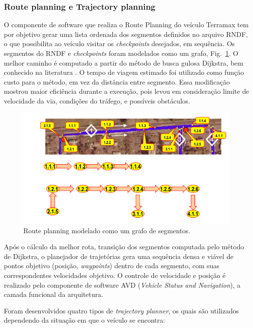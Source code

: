 \subsubsection{Route planning e Trajectory planning}

O componente de software que realiza o Route Planning do veículo Terramax tem
por objetivo gerar uma lista ordenada dos segmentos definidos no arquivo RNDF, o
que possibilita ao veículo visitar os \textit{checkpoints} desejados, em
sequência. Os segmentos do RNDF e \textit{checkpoints} foram modelados como um
grafo, Fig.~\ref{fig:route}. O melhor caminho é computado a partir do método de
busca gulosa Dijkstra, bem conhecido na literatura \cite{cormen2001dijkstra}. O
tempo de viagem estimado foi utilizado como função custo para o método, em vez
da distância entre segmento. Essa modificação mostrou maior eficiência durante a
execução, pois levou em consideração limite de velocidade da via, condições do
tráfego, e possíveis obstáculos.

\begin{figure}[!ht]
\centering
\includegraphics[width=\columnwidth]{figs/route}
\caption{Route planning modelado como um grafo de segmentos.}
\label{fig:route}
\end{figure}

Após o cálculo da melhor rota, transição dos segmentos computada pelo método de
Dijkstra, o planejador de trajetórias gera uma sequência densa e viável de
pontos objetivo (posição, \textit{waypoints}) dentro de cada segmento, com suas
correspondentes velocidades objetivo. O controle de velocidade e posição é
realizado pelo componente de software AVD (\textit{Vehicle Status and
Navigation}), a camada funcional da arquitetura. 

Foram desenvolvidos quatro tipos de \textit{trajectory planner}, os quais são
utilizados dependendo da situação em que o veículo se encontra:

